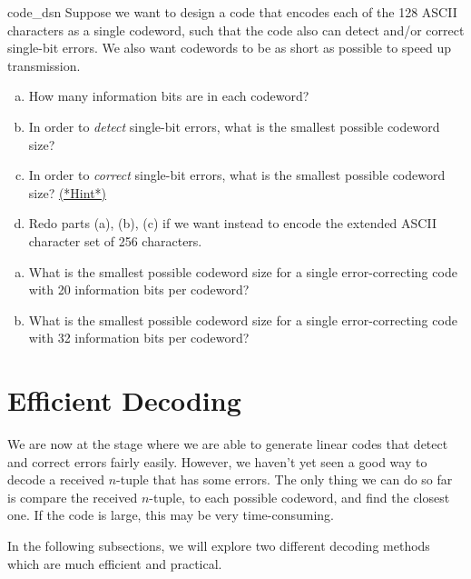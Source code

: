  \begin{exercise}{code_dsn}
 Suppose we want to design a code that encodes each of the 128 ASCII characters as a single codeword, such that the code also can detect and/or correct single-bit errors. We also want codewords to be as short as possible to speed up transmission. 
 \begin{enumerate}[(a)]
 \item
 How many information bits are in each codeword?
 \item
 In order to \emph{detect} single-bit errors, what is the smallest possible codeword size?
\item
 In order to \emph{correct} single-bit errors, what is the smallest possible codeword size?  \hyperref[sec:ErrorAndCorrectionCode:Hints]{(*Hint*)}

\item
Redo parts (a), (b), (c) if we want instead to encode the extended ASCII character set of 256 characters.
\end{enumerate}
\end{exercise}

\begin{exercise}{}
\begin{enumerate}[(a)]
\item
What is the smallest possible codeword size for a single error-correcting code with 20 information bits per codeword? 
\item
What is the smallest possible codeword size for a single error-correcting code with 32 information bits per codeword? 
\end{enumerate}
\end{exercise}

\section{Efficient Decoding}
\label{sec:ErrorAndCorrectionCode:EfficientDecoding}
 
 
We are now at the stage where we are able to generate linear codes
that detect and correct errors fairly easily. However, we haven't yet seen  a good way 
 to decode a received $n$-tuple that has some errors. The only thing we can do so far is compare  the received $n$-tuple, 
to each possible codeword, and find the closest one.
If the code is large, this may be very time-consuming. 

In the following subsections, we will explore two different decoding methods which are much efficient and practical.
 
